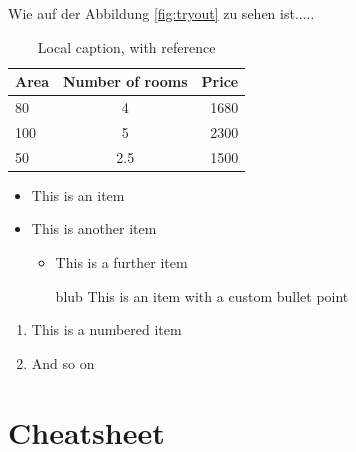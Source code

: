 \documentclass{article}
\begin{document}
Wie auf der Abbildung \ref{fig:tryout} zu sehen ist.....


\begin{table}[H]
	\centering
	\label{tab:tryouttab}
\caption[This is an optional caption, without reference]{Local caption, with reference}
	\cite{ref:ds_1, ref:nn_1, ref:ai_1}	%

	\begin{tabular}{l c r}
		Area & Number of rooms & Price \\ \hline
		80	& 4				& 1680 \\
		100	& 5				& 2300 \\
		50	& 2.5				& 1500 \\
		
	\end{tabular}
\end{table}


\begin{itemize}
	\item This is an item
	\item This is another item
	\begin{itemize}
		\item This is a further item
		\item [blub] This is an item with a custom bullet point
	\end{itemize}
\end{itemize}

\begin{enumerate}
	\item This is a numbered item
	\item And so on
\end{enumerate}






\cleardoublepage


\cleardoublepage
\appendix
\section{Cheatsheet}
\end{document}
